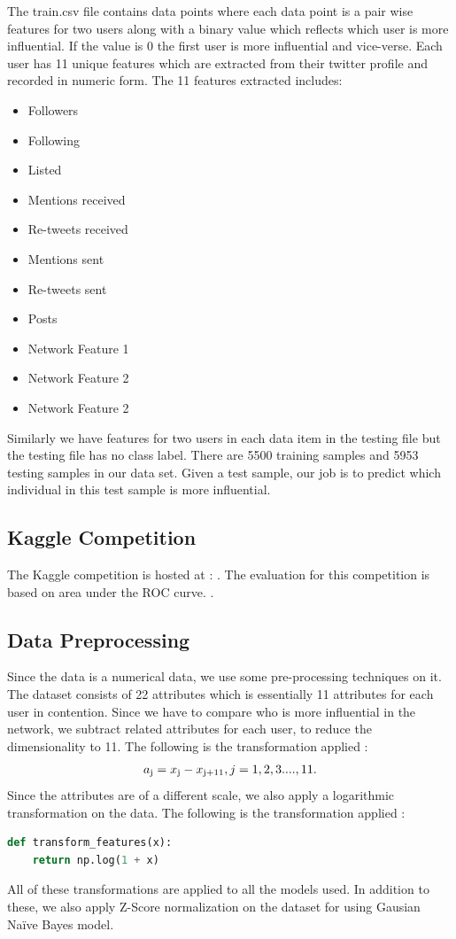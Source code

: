 \documentclass[conference]{IEEEtran}
\numberwithin{equation}{section}
\numberwithin{figure}{section}
\numberwithin{table}{section}
\begin{document}
The train.csv file contains data points where each data point is a pair wise features for two users along with a binary value which reflects which user is more influential. If the value is 0 the first user is more influential and vice-verse. Each user has 11 unique features which are extracted from their twitter profile and recorded in numeric form. The 11 features extracted includes:

\begin{itemize}
  \item Followers
  \item Following
  \item Listed
  \item Mentions received
  \item Re-tweets received
  \item Mentions sent
  \item Re-tweets sent
  \item Posts
  \item Network Feature 1
  \item Network Feature 2
  \item Network Feature 2
\end{itemize}

Similarly we have features for two users in each data item in the testing file but the testing file has no class label. There are 5500 training samples and 5953 testing samples in our data set. Given a test sample, our job is to predict which individual in this test sample is more influential.

\subsection{Kaggle Competition}
The Kaggle competition is hosted at : \cite{kaggle2}. The evaluation for this competition is based on area under the ROC curve. \cite{roc}.

\subsection{Data Preprocessing
}\label{sec:formatting-text}

Since the data is a numerical data, we use some pre-processing techniques on it. The dataset consists of 22 attributes which is essentially 11 attributes for each user in contention. Since we have to compare who is more influential in the network, we subtract related attributes for each user, to reduce the dimensionality to 11. The following is the transformation applied : 
\begin{align*}
a\textsubscript{j} = x\textsubscript{j} - x\textsubscript{j+11}, j = 1,2,3 .... , 11. 
\end{align*}
Since the attributes are of a different scale, we also apply a logarithmic transformation on the data. The following is the transformation applied :
\begin{lstlisting}[language=Python, caption = Log Transformation ]
def transform_features(x):
    return np.log(1 + x)
\end{lstlisting}
All of these transformations are applied to all the models used. In addition to these, we also apply Z-Score normalization on the dataset for using Gausian Na{\"i}ve Bayes model.
\end{document}
